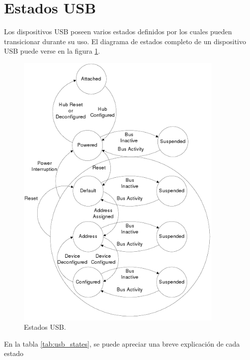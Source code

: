 \section{Estados USB}
Los dispositivos USB poseen varios estados definidos por los cuales pueden
transicionar durante su uso.
El diagrama de estados completo de un dispositivo USB puede verse en la figura
\ref{fig:usb_states}.


\begin{figure}[htp]
\centering
\includegraphics[width=10cm]{./img/usb_states.png}
\caption{Estados USB.}
\label{fig:usb_states}
\end{figure}


En la tabla \ref{tab:usb_states}, se puede apreciar una breve explicaci\'on de
cada estado

